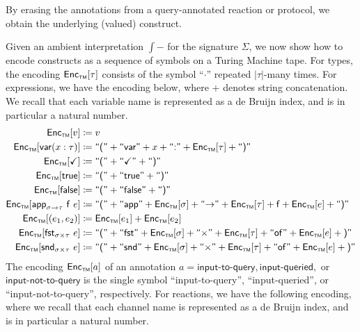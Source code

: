 \noindent By erasing the annotations from a query-annotated reaction or protocol, we obtain the underlying (valued) \ipdl construct.

Given an ambient interpretation $\int{-}$ for the \ipdl signature $\Sigma$, we now show how to encode \ipdl constructs as a sequence of symbols on a Turing Machine tape. For types, the encoding $\mathsf{Enc}_{\scriptscriptstyle \mathsf{TM}}[\tau]$ consists of the symbol \textsf{``$\cdot$''} repeated $|\tau|$-many times. For expressions, we have the encoding below, where + denotes string concatenation. We recall that each variable name is represented as a de Bruijn index, and is in particular a natural number.
\begin{align*}
\mathsf{Enc}_{\scriptscriptstyle \mathsf{TM}}[v] & \coloneqq v \\
\mathsf{Enc}_{\scriptscriptstyle \mathsf{TM}}[\mathsf{var}(x : \tau)] & \coloneqq \textsf{``(''} + \textsf{``var''} + x + \textsf{``:''} + \mathsf{Enc}_{\scriptscriptstyle \mathsf{TM}}[\tau] + \textsf{``)''} \\
\mathsf{Enc}_{\scriptscriptstyle \mathsf{TM}}[\checkmark] & \coloneqq \textsf{``(''} + \textsf{``$\checkmark$''} + \textsf{``)''} \\
\mathsf{Enc}_{\scriptscriptstyle \mathsf{TM}}[\mathsf{true}] & \coloneqq \textsf{``(''} + \textsf{``true''} + \textsf{``)''} \\
\mathsf{Enc}_{\scriptscriptstyle \mathsf{TM}}[\mathsf{false}] & \coloneqq \textsf{``(''} + \textsf{``false''} + \textsf{``)''} \\
\mathsf{Enc}_{\scriptscriptstyle \mathsf{TM}}[\mathsf{app}_{\sigma \to \tau} \ \mathsf{f} \ e] & \coloneqq \textsf{``(''} + \textsf{``app''} + \mathsf{Enc}_{\scriptscriptstyle \mathsf{TM}}[\sigma] + \textsf{``$\to$''} + \mathsf{Enc}_{\scriptscriptstyle \mathsf{TM}}[\tau] + \mathsf{f} + \mathsf{Enc}_{\scriptscriptstyle \mathsf{TM}}[e] + \textsf{``)''}\\
\mathsf{Enc}_{\scriptscriptstyle \mathsf{TM}}[(e_1, e_2)] & \coloneqq \mathsf{Enc}_{\scriptscriptstyle \mathsf{TM}}[e_1] + \mathsf{Enc}_{\scriptscriptstyle \mathsf{TM}}[e_2] \\
\mathsf{Enc}_{\scriptscriptstyle \mathsf{TM}}[\mathsf{fst}_{\sigma \times \tau} \ e] & \coloneqq \textsf{``(''} + \textsf{``fst''} + \mathsf{Enc}_{\scriptscriptstyle \mathsf{TM}}[\sigma] + \textsf{``$\times$''} + \mathsf{Enc}_{\scriptscriptstyle \mathsf{TM}}[\tau] + \textsf{``of''} + \mathsf{Enc}_{\scriptscriptstyle \mathsf{TM}}[e] + \textsf{)''} \\
\mathsf{Enc}_{\scriptscriptstyle \mathsf{TM}}[\mathsf{snd}_{\sigma \times \tau} \ e] & \coloneqq \textsf{``(''} + \textsf{``snd''} + \mathsf{Enc}_{\scriptscriptstyle \mathsf{TM}}[\sigma] + \textsf{``$\times$''} + \mathsf{Enc}_{\scriptscriptstyle \mathsf{TM}}[\tau] + \textsf{``of''} + \mathsf{Enc}_{\scriptscriptstyle \mathsf{TM}}[e] + \textsf{)''} \\
\end{align*}
The encoding $\mathsf{Enc}_{\scriptscriptstyle \mathsf{TM}}[a]$ of an annotation $a = \textsf{input-to-query}, \textsf{input-queried},$ or $\textsf{input-not-to-query}$ is the single symbol \textsf{``input-to-query''}, \textsf{``input-queried''}, or \textsf{``input-not-to-query''}, respectively. For reactions, we have the following encoding, where we recall that each channel name is represented as a de Bruijn index, and is in particular a natural number.
